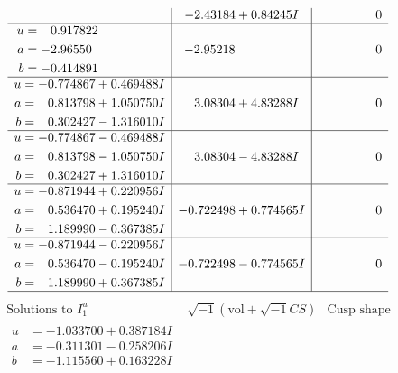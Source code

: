 \documentclass[1p]{elsarticle_modified}
\theoremstyle{definition}
\newcommand{\I}{\sqrt{-1}}
\begin{document}
$$\begin{array}{c|c|c}
 & -2.43184 + 0.84245 I & \phantom{-0.000000 } 0 \\ \hline\begin{aligned}
u &= \phantom{-}0.917822\phantom{ +0.000000I} \\
a &= -2.96550\phantom{ +0.000000I} \\
b &= -0.414891\phantom{ +0.000000I}\end{aligned}
 & -2.95218\phantom{ +0.000000I} & \phantom{-0.000000 } 0 \\ \hline\begin{aligned}
u &= -0.774867 + 0.469488 I \\
a &= \phantom{-}0.813798 + 1.050750 I \\
b &= \phantom{-}0.302427 - 1.316010 I\end{aligned}
 & \phantom{-}3.08304 + 4.83288 I & \phantom{-0.000000 } 0 \\ \hline\begin{aligned}
u &= -0.774867 - 0.469488 I \\
a &= \phantom{-}0.813798 - 1.050750 I \\
b &= \phantom{-}0.302427 + 1.316010 I\end{aligned}
 & \phantom{-}3.08304 - 4.83288 I & \phantom{-0.000000 } 0 \\ \hline\begin{aligned}
u &= -0.871944 + 0.220956 I \\
a &= \phantom{-}0.536470 + 0.195240 I \\
b &= \phantom{-}1.189990 - 0.367385 I\end{aligned}
 & -0.722498 + 0.774565 I & \phantom{-0.000000 } 0 \\ \hline\begin{aligned}
u &= -0.871944 - 0.220956 I \\
a &= \phantom{-}0.536470 - 0.195240 I \\
b &= \phantom{-}1.189990 + 0.367385 I\end{aligned}
 & -0.722498 - 0.774565 I & \phantom{-0.000000 } 0\\
 \hline 
 \end{array}$$\newpage$$\begin{array}{c|c|c}  
\text{Solutions to }I^u_{1}& \I (\text{vol} + \sqrt{-1}CS) & \text{Cusp shape}\\
 \hline 
\begin{aligned}
u &= -1.033700 + 0.387184 I \\
a &= -0.311301 - 0.258206 I \\
b &= -1.115560 + 0.163228 I\end{aligned}

\end{array}$$
\end{document}
